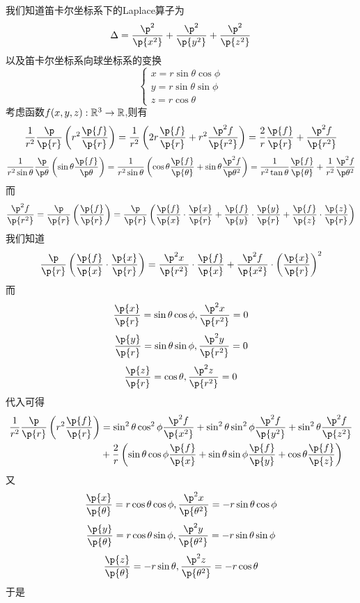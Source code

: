 \documentclass{ctexart}
\begin{document}
\begin{solution}[Proof.]
    我们知道笛卡尔坐标系下的Laplace算子为
    $$\Delta=\dfrac{\p^2}{\p{x^2}}+\dfrac{\p^2}{\p{y^2}}+\dfrac{\p^2}{\p{z^2}}$$
    以及笛卡尔坐标系向球坐标系的变换
    $$\left\{\begin{array}{l}
    x=r\sin\theta\cos\phi\\
    y=r\sin\theta\sin\phi\\
    z=r\cos\theta
    \end{array}\right.$$
    考虑函数$f(x,y,z):\mathbb{R}^3\to\mathbb{R}$,则有
    $$\dfrac{1}{r^2}\dfrac{\p}{\p{r}}\left(r^2\dfrac{\p{f}}{\p{r}}\right)
    =\dfrac{1}{r^2}\left(2r\dfrac{\p{f}}{\p{r}}+r^2\dfrac{\p^2 f}{\p{r^2}}\right)
    =\dfrac{2}{r}\dfrac{\p{f}}{\p{r}}+\dfrac{\p^2f}{\p{r^2}}
    $$
    $$\dfrac{1}{r^2\sin\theta}\dfrac{\p}{\p\theta}\left(\sin\theta\dfrac{\p{f}}{\p\theta}\right)
    =\dfrac{1}{r^2\sin\theta}\left(\cos\theta\dfrac{\p{f}}{\p{\theta}}+\sin\theta\dfrac{\p^2f}{\p\theta^2}\right)
    =\dfrac{1}{r^2\tan\theta}\dfrac{\p{f}}{\p{\theta}}+\dfrac{1}{r^2}\dfrac{\p^2f}{\p\theta^2}$$
    而
    $$\dfrac{\p^2{f}}{\p{r^2}}=\dfrac{\p}{\p{r}}\left(\dfrac{\p{f}}{\p{r}}\right)=\dfrac{\p}{\p{r}}\left(\dfrac{\p{f}}{\p{x}}\cdot\dfrac{\p{x}}{\p{r}}+\dfrac{\p{f}}{\p{y}}\cdot\dfrac{\p{y}}{\p{r}}+\dfrac{\p{f}}{\p{z}}\cdot\dfrac{\p{z}}{\p{r}}\right)$$
    我们知道$$\dfrac{\p}{\p{r}}\left(\dfrac{\p{f}}{\p{x}}\cdot\dfrac{\p{x}}{\p{r}}\right)=\dfrac{\p^2x}{\p{r^2}}\cdot\dfrac{\p{f}}{\p{x}}+\dfrac{\p^2f}{\p{x^2}}\cdot\left(\dfrac{\p{x}}{\p{r}}\right)^2$$
    而
    $$\dfrac{\p{x}}{\p{r}}=\sin\theta\cos\phi,\dfrac{\p^2x}{\p{r^2}}=0$$
    $$\dfrac{\p{y}}{\p{r}}=\sin\theta\sin\phi,\dfrac{\p^2y}{\p{r^2}}=0$$
    $$\dfrac{\p{z}}{\p{r}}=\cos\theta,\dfrac{\p^2z}{\p{r^2}}=0$$
    代入可得
    $$\begin{aligned}
        \dfrac{1}{r^2}\dfrac{\p}{\p{r}}\left(r^2\dfrac{\p{f}}{\p{r}}\right)
        &= \sin^2\theta\cos^2\phi\dfrac{\p^2f}{\p{x^2}}+\sin^2\theta\sin^2\phi\dfrac{\p^2f}{\p{y^2}}+\sin^2\theta\dfrac{\p^2f}{\p{z^2}}\\
        &+ \dfrac{2}{r}\left(\sin\theta\cos\phi\dfrac{\p{f}}{\p{x}}+\sin\theta\sin\phi\dfrac{\p{f}}{\p{y}}+\cos\theta\dfrac{\p{f}}{\p{z}}\right)
    \end{aligned}$$
    又
    $$\dfrac{\p{x}}{\p{\theta}}=r\cos\theta\cos\phi,\dfrac{\p^2x}{\p{\theta^2}}=-r\sin\theta\cos\phi$$
    $$\dfrac{\p{y}}{\p{\theta}}=r\cos\theta\sin\phi,\dfrac{\p^2y}{\p{\theta^2}}=-r\sin\theta\sin\phi$$
    $$\dfrac{\p{z}}{\p{\theta}}=-r\sin\theta,\dfrac{\p^2z}{\p{\theta^2}}=-r\cos\theta$$
    于是

\end{solution}
\end{document}
